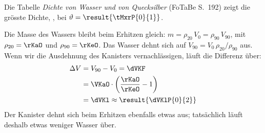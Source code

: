 \begin{abcliste}
\abc Die Tabelle \emph{Dichte von Wasser und von Quecksilber} (FoTaBe S.~192) zeigt die grösste Dichte, \rMxO, bei $\vartheta = \result{\tMxrP{0}{1}}$.

\abc Die Masse des Wassers bleibt beim Erhitzen gleich: $m = \rho_{20}\,V_0 = \rho_{90}\,V_{90}$, mit $\rho_{20} = \rKaO$ und $\rho_{90} = \rKeO$. Das Wasser dehnt sich auf $V_{90} = V_0\,\rho_{20}/\rho_{90}$ aus. Wenn wir die Ausdehnung des Kanisters vernachlässigen, läuft die Differenz über:
\begin{align}
 \Delta V &= V_{90}-V_0 = \dVKF \\
   &= \VKaO\cdot\left(\frac{\rKaO}{\rKeO}-1\right) \\
   &= \dVKl \approx \result{\dVKlP{0}{2}}
\end{align}
Der Kanister dehnt sich beim Erhitzen ebenfalls etwas aus; tatsächlich läuft deshalb etwas weniger Wasser über.
\end{abcliste}
